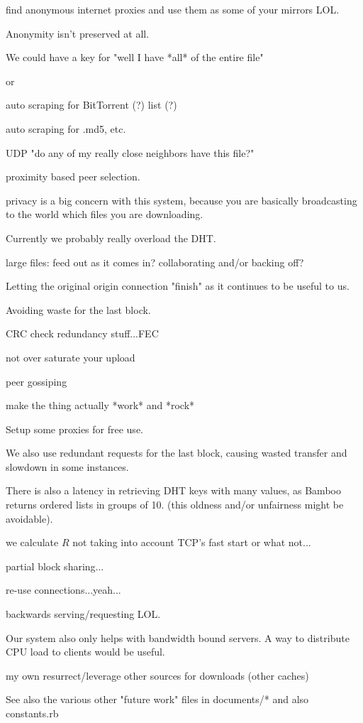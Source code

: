 find anonymous internet proxies and use them as some of your mirrors LOL.

Anonymity isn't preserved at all.

We could have a key for "well I have *all* of the entire file"

or 

auto scraping for BitTorrent (?) list (?)

auto scraping for .md5, etc.

UDP "do any of my really close neighbors have this file?"

proximity based peer selection.

privacy is a big concern with this system, because you are basically broadcasting to the world which files you are downloading.

Currently we probably really overload the DHT.

large files: feed out as it comes in?
 collaborating and/or backing off?
 
Letting the original origin connection "finish" as it continues to be useful to us.

Avoiding waste for the last block. 
 
CRC check redundancy stuff...FEC

not over saturate your upload

peer gossiping

make the thing actually *work* and *rock*

Setup some proxies for free use.

We also use redundant requests for the last block, causing wasted transfer and slowdown in some instances.  

There is also a latency in retrieving DHT keys with many values, as Bamboo returns ordered lists in groups of 10.
(this oldness and/or unfairness might be avoidable).

we calculate $R$ not taking into account TCP's fast start or what not...

partial block sharing...

re-use connections...yeah...

backwards serving/requesting LOL.

Our system also only helps with bandwidth bound servers.  A way to distribute CPU load to clients would be useful.


my own resurrect/leverage other sources for downloads (other caches)

See also the various other "future work" files in documents/* and also constants.rb

